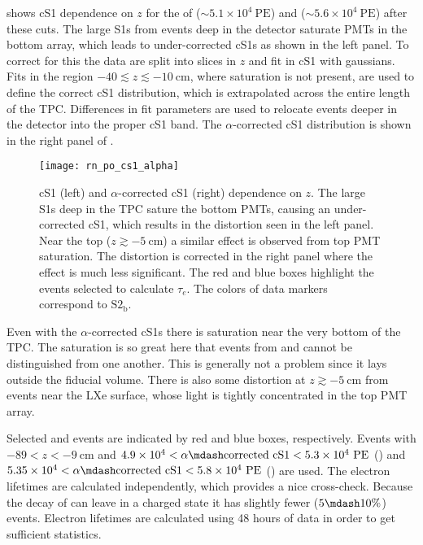  shows cS1 dependence on $z$ for the \alphadecays of 
(${\sim} 5.1 \times 10^4 \ \mathrm{PE}$) and  (${\sim} 5.6 \times 10^4\ \mathrm{PE}$) after these cuts.  The large
S1s from events deep in the detector saturate PMTs in the bottom array, which leads to under-corrected cS1s as shown in the left
panel.  To correct for this the data are split into slices in $z$ and fit in cS1 with gaussians.  Fits in the region
$-40 \lesssim z \lesssim -10\ \mathrm{cm}$, where saturation is not present, are used to define the correct cS1 distribution, which is
extrapolated across the entire length of
the TPC.  Differences in fit parameters are used to relocate events deeper in the detector into the proper cS1 band.  The
$\alpha$-corrected cS1 distribution is shown in the right panel of .

\begin{figure}
\centering
\texttt{[image: rn\_po\_cs1\_alpha]}
\caption[cS1 (left) and $\alpha$-corrected cS1 (right) dependence on $z$ for  and  $\alpha$-decays.]{cS1 (left) and
$\alpha$-corrected cS1 (right) dependence on $z$.  The large \alphadecay S1s deep in
the TPC sature the bottom PMTs, causing an under-corrected cS1, which
results in the distortion seen in the left panel.  Near the top ($z \gtrsim -5\ \mathrm{cm}$) a similar effect is observed from top PMT
saturation.  The distortion is corrected in the right panel where the effect is much less significant.  The red and blue boxes highlight
the events selected to calculate $\tau_e$.  The colors of data markers correspond to $\mathrm{S2_b}$.}
\label{fig:electron_lifetimes_measurement_alphas_s1}
\end{figure}

Even with the $\alpha$-corrected cS1s there is saturation near the very bottom of the TPC.  The saturation is so great
here that events from  and  cannot be distinguished from one another.  This is generally not a problem since it
lays outside the fiducial volume.  There is also some distortion at $z \gtrsim -5\ \mathrm{cm}$ from events
near the LXe surface, whose light is tightly concentrated in the top PMT array.

Selected  and  events are indicated by red and blue boxes, respectively.  Events with $-89< z < -9\ \mathrm{cm}$
and $4.9 \times 10^4 < \alpha \mdash \mathrm{corrected\ cS1} < 5.3 \times 10^4\ \mathrm{PE}$ () and
$5.35 \times 10^4 < \alpha \mdash \mathrm{corrected\ cS1} < 5.8 \times 10^4\ \mathrm{PE}$ () are used.  The electron
lifetimes are calculated independently, which provides a nice cross-check.  Because the decay of  can leave 
in a charged state it has slightly fewer ($5 \mdash 10\%$) events.  Electron lifetimes are calculated using 48 hours of data in order to
get sufficient statistics.

